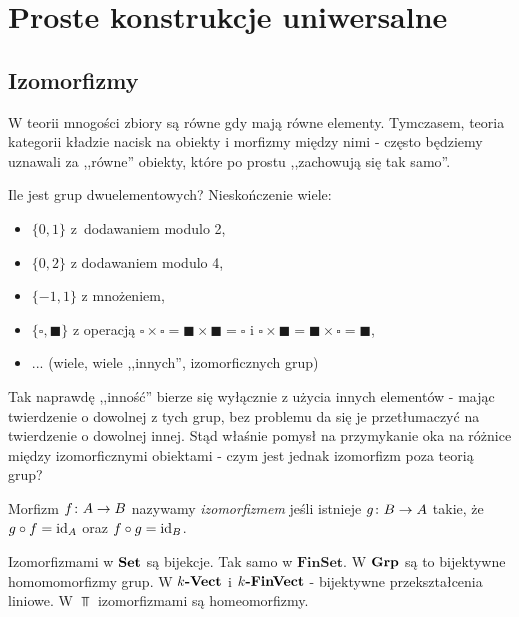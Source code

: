 \section{Proste konstrukcje uniwersalne}
\subsection{Izomorfizmy}
\begin{idea}
  W teorii mnogości zbiory są równe gdy mają równe elementy. Tymczasem, teoria kategorii kładzie nacisk na obiekty i morfizmy między nimi - często będziemy uznawali za ,,równe'' obiekty, które po prostu ,,zachowują się tak samo''.
\end{idea}

\begin{exmp}
  Ile jest grup dwuelementowych? Nieskończenie wiele:
  \begin{itemize}
    \item $\{0, 1\}$ z~dodawaniem modulo 2,
    \item $\{0, 2\}$ z dodawaniem modulo 4,
    \item $\{-1, 1\}$ z mnożeniem,
    \item $\{\square, \blacksquare\}$ z operacją $\square \times \square = \blacksquare \times \blacksquare = \square$ i $\square \times \blacksquare = \blacksquare\times \square = \blacksquare$,
    \item ... (wiele, wiele ,,innych'', izomorficznych grup)
  \end{itemize}
  Tak naprawdę ,,inność'' bierze się wyłącznie z użycia innych elementów - mając twierdzenie o dowolnej z tych grup, bez problemu da się je przetłumaczyć na twierdzenie o dowolnej innej. Stąd właśnie pomysł na przymykanie oka na różnice między izomorficznymi obiektami - czym jest jednak izomorfizm poza teorią grup?
\end{exmp}

\begin{defn}
  \label{defn:izomorfizm}
  Morfizm $f\colon A\to B$ nazywamy \emph{izomorfizmem} jeśli istnieje $g\colon B\to A$ takie, że $g\circ f = \mathrm{id}_{A}$ oraz $f\circ g = \mathrm{id}_{B}$.
\end{defn}

\begin{exmp}
  Izomorfizmami w $\textbf{Set}$ są bijekcje. Tak samo w $\textbf{FinSet}$. W $\textbf{Grp}$ są to bijektywne homomomorfizmy grup. W $k\textbf{-Vect}$ i $k\textbf{-FinVect}$ - bijektywne przekształcenia liniowe. W $\Top$ izomorfizmami są homeomorfizmy.
\end{exmp}

